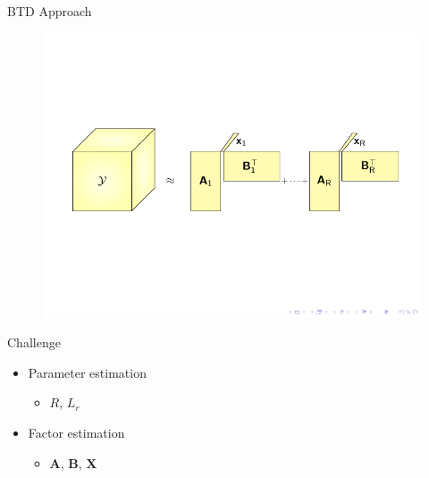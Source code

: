 \documentclass{beamer}
\begin{document}
	\begin{frame}{BTD Approach}
		
		\vspace{-0.7cm}
		\begin{figure}[htb]
			\centering
			\includegraphics[scale=1.0,clip=true,trim={0.8cm 6.5cm 0.6cm 6.2cm}]{fig/tikz_BTDY.pdf}
		\end{figure}
		\vspace{2.8cm}
		\begin{block}{Challenge}			
				\begin{itemize}
					\item Parameter estimation
					\begin{itemize}
						\item $R$, $L_{r}$
					\end{itemize}
					\item Factor estimation
					\begin{itemize}
						\item $\textbf{A}$, $\textbf{B}$, $\textbf{X}$
					\end{itemize}
				\end{itemize}
		\end{block}
	\end{frame}
\end{document}
